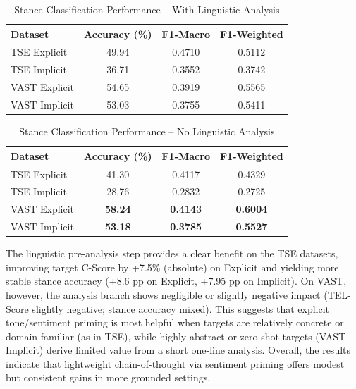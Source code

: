 \documentclass[conference]{IEEEtran}
\begin{document}
\begin{table}[htbp]
\centering
\caption{Stance Classification Performance -- With Linguistic Analysis}
\label{tab:stance_with}
\small
\begin{tabular}{|l|c|c|c|}
\hline
\textbf{Dataset} & \textbf{Accuracy (\%)} & \textbf{F1-Macro} & \textbf{F1-Weighted} \\
\hline
TSE Explicit     & 49.94 & 0.4710 & 0.5112 \\
TSE Implicit     & 36.71 & 0.3552 & 0.3742 \\
VAST Explicit    & 54.65 & 0.3919 & 0.5565 \\
VAST Implicit    & 53.03 & 0.3755 & 0.5411 \\
\hline
\end{tabular}
\end{table}

\begin{table}[htbp]
\centering
\caption{Stance Classification Performance -- No Linguistic Analysis}
\label{tab:stance_no}
\small
\begin{tabular}{|l|c|c|c|}
\hline
\textbf{Dataset} & \textbf{Accuracy (\%)} & \textbf{F1-Macro} & \textbf{F1-Weighted} \\
\hline
TSE Explicit     & 41.30 & 0.4117 & 0.4329 \\
TSE Implicit     & 28.76 & 0.2832 & 0.2725 \\
VAST Explicit    & \textbf{58.24} & \textbf{0.4143} & \textbf{0.6004} \\
VAST Implicit    & \textbf{53.18} & \textbf{0.3785} & \textbf{0.5527} \\
\hline
\end{tabular}
\end{table}

The linguistic pre-analysis step provides a clear benefit on the TSE datasets, improving target C-Score by +7.5\% (absolute) on Explicit and yielding more stable stance accuracy (+8.6 pp on Explicit, +7.95 pp on Implicit). On VAST, however, the analysis branch shows negligible or slightly negative impact (TEL-Score slightly negative; stance accuracy mixed). This suggests that explicit tone/sentiment priming is most helpful when targets are relatively concrete or domain-familiar (as in TSE), while highly abstract or zero-shot targets (VAST Implicit) derive limited value from a short one-line analysis. Overall, the results indicate that lightweight chain-of-thought via sentiment priming offers modest but consistent gains in more grounded settings.
\end{document}
